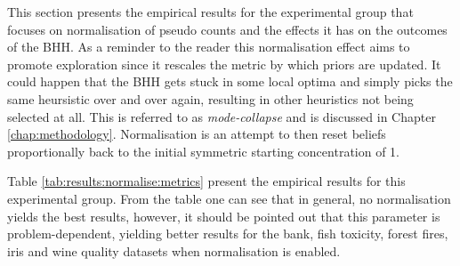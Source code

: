 This section presents the empirical results for the experimental group that focuses on normalisation of pseudo counts and the effects it has on the outcomes of the \Ac{BHH}. As a reminder to the reader this normalisation effect aims to promote exploration since it rescales the metric by which priors are updated. It could happen that the \Ac{BHH} gets stuck in some local optima and simply picks the same heursistic over and over again, resulting in other heuristics not being selected at all. This is referred to as \textit{mode-collapse} and is discussed in Chapter \ref{chap:methodology}. Normalisation is an attempt to then reset beliefs proportionally back to the initial symmetric starting concentration of 1.

Table \ref{tab:results:normalise:metrics} present the empirical results for this experimental group. From the table one can see that in general, no normalisation yields the best results, however, it should be pointed out that this parameter is problem-dependent, yielding better results for the bank, fish toxicity, forest fires, iris and wine quality datasets when normalisation is enabled.


